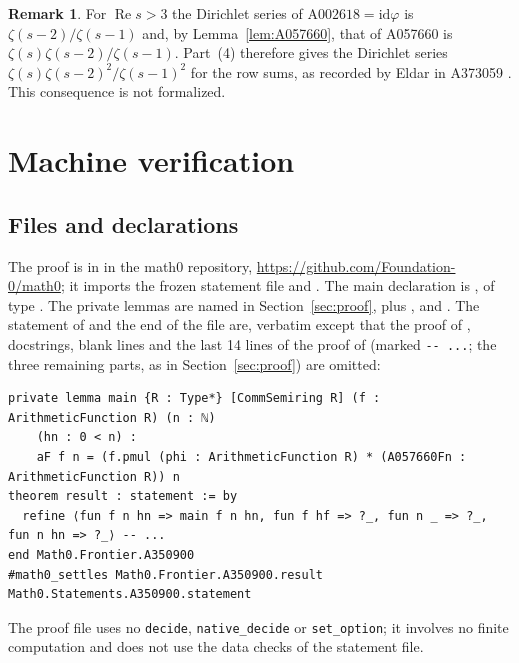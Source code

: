 \documentclass[11pt]{amsart}
\theoremstyle{plain}
\theoremstyle{definition}
\newtheorem{remark}[theorem]{Remark}
\newcommand{\idf}{\mathrm{id}}
\newcommand{\A}[1]{\mathrm{A#1}}
\begin{document}
\begin{remark}\label{rem:dgf}
For $\operatorname{Re}s>3$ the Dirichlet series of $\A{002618}=\idf\varphi$ is $\zeta(s-2)/\zeta(s-1)$ and, by Lemma~\ref{lem:A057660}, that of A057660 is $\zeta(s)\zeta(s-2)/\zeta(s-1)$. Part~(4) therefore gives the Dirichlet series $\zeta(s)\zeta(s-2)^2/\zeta(s-1)^2$ for the row sums, as recorded by Eldar in A373059 \cite{A373059}. This consequence is not formalized.
\end{remark}

\section{Machine verification}\label{sec:lean}

\subsection*{Files and declarations}
The proof is in  in the math0 repository, \url{https://github.com/Foundation-0/math0}; it imports the frozen statement file and . The main declaration is , of type . The private lemmas are named in Section~\ref{sec:proof}, plus ,  and . The statement of  and the end of the file are, verbatim except that the proof of , docstrings, blank lines and the last 14 lines of the proof of  (marked \texttt{-{}- ...}; the three remaining parts, as in Section~\ref{sec:proof}) are omitted:
\begin{lstlisting}
private lemma main {R : Type*} [CommSemiring R] (f : ArithmeticFunction R) (n : ℕ)
    (hn : 0 < n) :
    aF f n = (f.pmul (phi : ArithmeticFunction R) * (A057660Fn : ArithmeticFunction R)) n
theorem result : statement := by
  refine ⟨fun f n hn => main f n hn, fun f hf => ?_, fun n _ => ?_, fun n hn => ?_⟩ -- ...
end Math0.Frontier.A350900
#math0_settles Math0.Frontier.A350900.result Math0.Statements.A350900.statement
\end{lstlisting}
The proof file uses no \texttt{decide}, \texttt{native\_decide} or \texttt{set\_option}; it involves no finite computation and does not use the data checks of the statement file.
\end{document}
